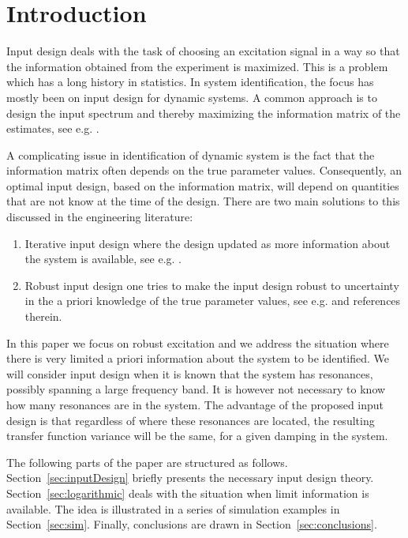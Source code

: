 \section{Introduction}\label{sec:intro}
Input design deals with the task of choosing an excitation signal in a way so that the information obtained from the experiment is maximized. This is a problem which has a long history in statistics. In system identification, the focus has mostly been on input design for dynamic systems. A common approach is to design the input spectrum and thereby maximizing the information matrix of the estimates, see e.g. \cite{Fedorov1972,Goodwin1977}.

A complicating issue in identification of dynamic system is the fact that the information matrix often depends on the true parameter values. Consequently, an optimal input design, based on the information matrix, will depend on quantities that are not know at the time of the design. There are two main solutions to this discussed in the engineering literature:
\begin{enumerate}
\item Iterative input design where the design updated as more information about the system is available, see e.g. \cite{Hjalmarsson2005,Gevers2005}.
\item Robust input design one tries to make the input design robust to uncertainty in the a priori knowledge of the true parameter values, see e.g. \cite{Rojas2007} and references therein. 
\end{enumerate}

In this paper we focus on robust excitation and we address the situation where there is very limited a priori information about the system to be identified. We will consider input design when it is known that the system has resonances, possibly spanning a large frequency band. It is however not necessary to know how many resonances are in the system. The advantage of the proposed input design is that regardless of where these resonances are located, the resulting transfer function variance will be the same, for a given damping in the system.

The following parts of the paper are structured as follows. Section~\ref{sec:inputDesign} briefly presents the necessary input design theory. Section~\ref{sec:logarithmic} deals with the situation when limit information is available. The idea is illustrated in a series of simulation examples in Section~\ref{sec:sim}. Finally, conclusions are drawn in Section~\ref{sec:conclusions}.


